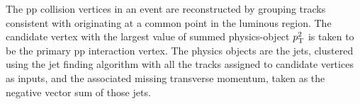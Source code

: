 The pp collision vertices in an event are reconstructed by grouping tracks consistent with originating at a common point in the luminous region.
The candidate vertex with the largest value of summed physics-object $p_{\mathrm{T}}^2$ is taken to be the primary pp interaction vertex.
The physics objects are the jets, clustered using the \antikt jet finding algorithm \cite{Cacciari:2008gp, Cacciari:2011ma} with all the tracks assigned to candidate vertices as inputs,
and the associated missing transverse momentum, taken as the negative vector \pt sum of those jets.
